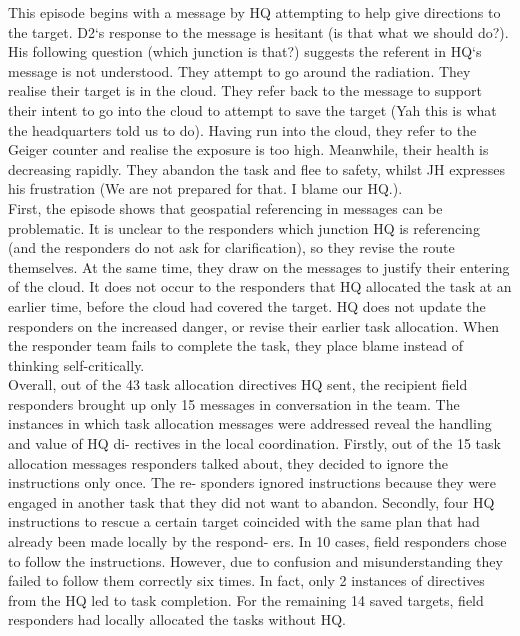 This episode begins with a message by HQ attempting to help give directions to the target. D2`s response to the message is hesitant (is that what we should do?). His following question (which junction is that?) suggests the referent in HQ`s message is not understood. They attempt to go around the radiation. They realise their target is in the cloud. They refer back to the message to support their intent to go into the cloud to attempt to save the target (Yah this is what the headquarters told us to do). Having run into the cloud, they refer to the Geiger counter and realise the exposure is too high. Meanwhile, their health is decreasing rapidly. They abandon the task and flee to safety, whilst JH expresses his frustration (We are not prepared for that. I blame our HQ.).\\

First, the episode shows that geospatial referencing in messages can be problematic. It is unclear to the responders which junction HQ is referencing (and the responders do not ask for clarification), so they revise the route themselves. At the same time, they draw on the messages to justify their entering of the cloud. It does not occur to the responders that HQ allocated the task at an earlier time, before the cloud had covered the target. HQ does not update the responders on the increased danger, or revise their earlier task allocation. When the responder team fails to complete the task, they place blame instead of thinking self-critically.\\

Overall, out of the 43 task allocation directives HQ sent, the recipient field responders brought up only 15 messages in conversation in the team. The instances in which task allocation messages were addressed reveal the handling and value of HQ di- rectives in the local coordination. Firstly, out of the 15 task allocation messages responders talked about, they decided to ignore the instructions only once. The re- sponders ignored instructions because they were engaged in another task that they did not want to abandon. Secondly, four HQ instructions to rescue a certain target coincided with the same plan that had already been made locally by the respond- ers. In 10 cases, field responders chose to follow the instructions. However, due to confusion and misunderstanding they failed to follow them correctly six times. In fact, only 2 instances of directives from the HQ led to task completion. For the remaining 14 saved targets, field responders had locally allocated the tasks without HQ.\\

